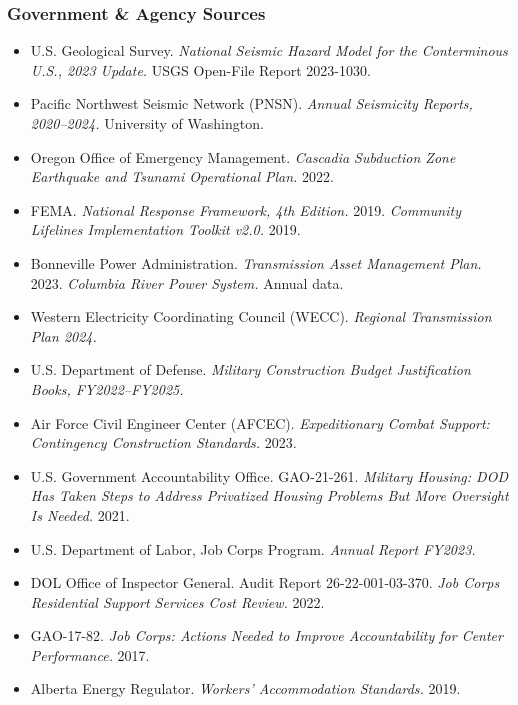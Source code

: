 \documentclass[11pt,letterpaper]{article}
\begin{document}
\subsubsection{Government \& Agency Sources}
\begin{itemize}[leftmargin=1.5em]
  \item U.S. Geological Survey. \textit{National Seismic Hazard Model for the Conterminous U.S., 2023 Update.} USGS Open-File Report 2023-1030.
  \item Pacific Northwest Seismic Network (PNSN). \textit{Annual Seismicity Reports, 2020--2024.} University of Washington.
  \item Oregon Office of Emergency Management. \textit{Cascadia Subduction Zone Earthquake and Tsunami Operational Plan.} 2022.
  \item FEMA. \textit{National Response Framework, 4th Edition.} 2019. \textit{Community Lifelines Implementation Toolkit v2.0.} 2019.
  \item Bonneville Power Administration. \textit{Transmission Asset Management Plan.} 2023. \textit{Columbia River Power System.} Annual data.
  \item Western Electricity Coordinating Council (WECC). \textit{Regional Transmission Plan 2024.}
  \item U.S. Department of Defense. \textit{Military Construction Budget Justification Books, FY2022--FY2025.}
  \item Air Force Civil Engineer Center (AFCEC). \textit{Expeditionary Combat Support: Contingency Construction Standards.} 2023.
  \item U.S. Government Accountability Office. GAO-21-261. \textit{Military Housing: DOD Has Taken Steps to Address Privatized Housing Problems But More Oversight Is Needed.} 2021.
  \item U.S. Department of Labor, Job Corps Program. \textit{Annual Report FY2023.}
  \item DOL Office of Inspector General. Audit Report 26-22-001-03-370. \textit{Job Corps Residential Support Services Cost Review.} 2022.
  \item GAO-17-82. \textit{Job Corps: Actions Needed to Improve Accountability for Center Performance.} 2017.
  \item Alberta Energy Regulator. \textit{Workers' Accommodation Standards.} 2019.
\end{itemize}
\end{document}
